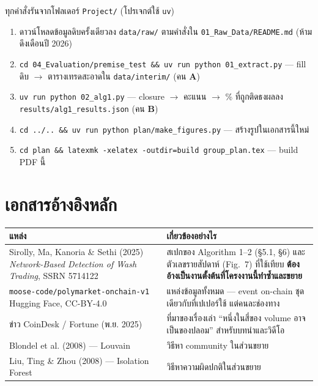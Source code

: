 \documentclass[11pt,a4paper]{article}
\newcommand{\sansall}{\sffamily}
\newcommand{\en}[1]{#1}
\newcommand{\code}[1]{\texttt{#1}}
\newcommand{\stg}[2]{\textcolor{#1}{\textbf{\en{#2}}}}
\newcommand{\rA}{\stg{accent}{A}}
\newcommand{\rB}{\stg{alg}{B}}
\newcommand{\thd}[1]{\sansall\bfseries #1}
\begin{document}
ทุกคำสั่งรันจากโฟลเดอร์ \code{Project/} (โปรเจกต์ใช้ \code{uv})

\begin{enumerate}
\item ดาวน์โหลดข้อมูลดิบครั้งเดียวลง \code{data/raw/} ตามคำสั่งใน \code{01\_Raw\_Data/README.md}
      (ห้ามดึงเดือนปี 2026)
\item \code{cd 04\_Evaluation/premise\_test \&\& uv run python 01\_extract.py} ---
      fill ดิบ \ensuremath{\to} ตารางเทรดสะอาดใน \code{data/interim/} (คน \rA)
\item \code{uv run python 02\_alg1.py} ---
      closure \ensuremath{\to} คะแนน \ensuremath{\to} \% ที่ถูกติดธง\newline ผลลง \code{results/alg1\_results.json} (คน \rB)
\item \code{cd ../.. \&\& uv run python plan/make\_figures.py} --- สร้างรูปในเอกสารนี้ใหม่
\item \code{cd plan \&\& latexmk -xelatex -outdir=build group\_plan.tex} --- build PDF นี้
\end{enumerate}

\section{เอกสารอ้างอิงหลัก}

\begin{table}[H]
\centering\small
\begin{tabular}{L{5.4cm}L{8.8cm}}
\toprule
\thd{แหล่ง} & \thd{เกี่ยวข้องอย่างไร} \\
\midrule
Sirolly, Ma, Kanoria \& Sethi (2025) \newline \emph{Network-Based Detection of Wash Trading},
SSRN 5714122 &
  สเปกของ Algorithm 1--2 (§5.1, §6) และตัวเลขรายสัปดาห์ (Fig.~7) ที่ใช้เทียบ
  \textbf{ต้องอ้างเป็นงานตั้งต้นที่โครงงานนี้ทำซ้ำและขยาย} \\
\addlinespace
\code{moose-code/polymarket-onchain-v1} \newline Hugging Face, CC-BY-4.0 &
  แหล่งข้อมูลทั้งหมด --- event on-chain ชุดเดียวกับที่เปเปอร์ใช้ แต่คนละช่องทาง \\
\addlinespace
ข่าว CoinDesk / Fortune (พ.ย. 2025) &
  ที่มาของเรื่องเล่า ``หนึ่งในสี่ของ volume อาจเป็นของปลอม'' สำหรับบทนำและวิดีโอ \\
\addlinespace
Blondel et al. (2008) --- Louvain &
  วิธีหา community ในส่วนขยาย \\
\addlinespace
Liu, Ting \& Zhou (2008) --- Isolation Forest &
  วิธีหาความผิดปกติในส่วนขยาย \\
\bottomrule
\end{tabular}
\end{table}
\end{document}
